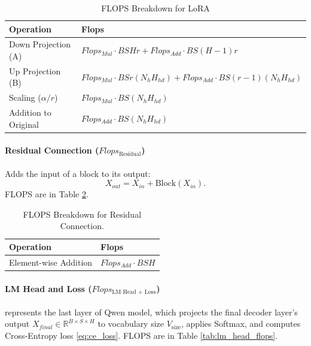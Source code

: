 \documentclass{article}
\begin{document}
\begin{table}[!thbp]
\renewcommand{\arraystretch}{1.4} \centering \setlength{\tabcolsep}{8pt}
\begin{tabular}{@{}ll@{}} %
    \toprule \textbf{Operation} & \textbf{Flops} \\ \midrule
    Down Projection (A) & $Flops_{Mul} \cdot BSH r + Flops_{Add} \cdot BS(H - 1) r$ \\ %
    Up Projection (B) & $Flops_{Mul} \cdot BS r (N_{h} H_{hd}) + Flops_{Add} \cdot BS(r - 1) (N_{h} H_{hd})$ \\ %
    Scaling ($\alpha/r$) & $Flops_{Mul} \cdot BS (N_{h} H_{hd})$ \\
    Addition to Original & $Flops_{Add} \cdot BS (N_{h} H_{hd})$ \\
    \bottomrule
\end{tabular}
\caption{FLOPS Breakdown for LoRA} \label{tab:lora_flops}
\end{table}

\paragraph{Residual Connection ($Flops_{\text{Residual}}$)}
Adds the input of a block to its output: 
$$X_{out} = X_{in} + \text{Block}(X_{in}).$$ FLOPS are in Table \ref{tab:residual_flops}.

\begin{table}[!thbp]
\renewcommand{\arraystretch}{1.4} \centering \setlength{\tabcolsep}{8pt}
\begin{tabular}{@{}ll@{}} %
    \toprule \textbf{Operation} & \textbf{Flops} \\ \midrule
    Element-wise Addition & $Flops_{Add} \cdot BSH$ \\
    \bottomrule
\end{tabular}
\caption{FLOPS Breakdown for Residual Connection.} \label{tab:residual_flops}
\end{table}

\paragraph{LM Head and Loss ($Flops_{\text{LM Head + Loss}}$)} represents the last layer of Qwen model, which
projects the final decoder layer's output $X_{final} \in \mathbb{R}^{B \times S \times H}$ to vocabulary size $V_{\text{size}}$, applies Softmax, and computes Cross-Entropy loss \ref{eq:ce_loss}. FLOPS are in Table \ref{tab:lm_head_flops}.
\end{document}
